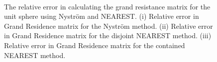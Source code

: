 \begin{figure}
    \centering
    \\
    \caption[The relative error in calculating the grand resistance matrix for the unit sphere using Nyström and NEAREST.]{The relative error in calculating the grand resistance matrix for the unit sphere using Nyström and NEAREST. (i) Relative error in Grand Residence matrix for the Nyström method. (ii) Relative error in Grand Residence matrix for the disjoint NEAREST method. (iii) Relative error in Grand Residence matrix for the contained NEAREST method.}
    \label{fig:NEARESTCOMP}
\end{figure}

